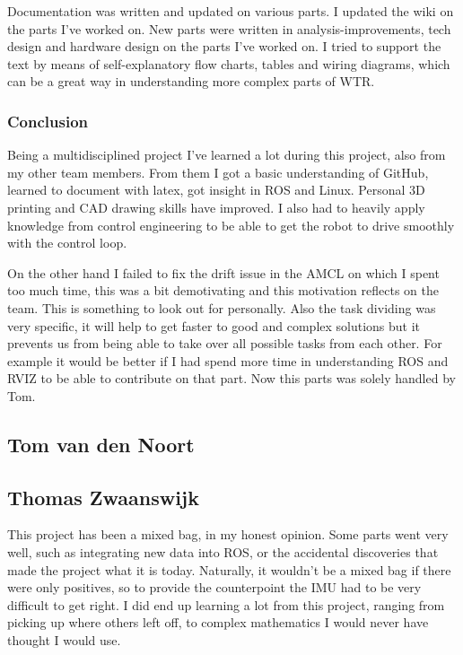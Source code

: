Documentation was written and updated on various parts. 
I updated the wiki on the parts I've worked on. 
New parts were written in analysis-improvements, tech design and hardware design on the parts I've worked on. 
I tried to support the text by means of self-explanatory flow charts, tables and wiring diagrams, which can be a great way in understanding more complex parts of WTR. 

\subsubsection{Conclusion}
Being a multidisciplined project I've learned a lot during this project, also from my other team members.
From them I got a basic understanding of GitHub, learned to document with latex, got insight in ROS and Linux. 
Personal 3D printing and CAD drawing skills have improved. 
I also had to heavily apply knowledge from control engineering to be able to get the robot to drive smoothly with the control loop.

On the other hand I failed to fix the drift issue in the AMCL on which I spent too much time, this was a bit demotivating and this motivation reflects on the team. This is something to look out for personally. 
Also the task dividing was very specific, it will help to get faster to good and complex solutions but it prevents us from being able to take over all possible tasks from each other. 
For example it would be better if I had spend more time in understanding ROS and RVIZ to be able to contribute on that part. Now this parts was solely handled by Tom.

\newpage

\subsection{Tom van den Noort}

\newpage

\subsection{Thomas Zwaanswijk}
This project has been a mixed bag, in my honest opinion.
Some parts went very well, such as integrating new data into ROS, or the accidental discoveries that made the project what it is today.
Naturally, it wouldn't be a mixed bag if there were only positives, so to provide the counterpoint the IMU had to be very difficult to get right.
I did end up learning a lot from this project, ranging from picking up where others left off, to complex mathematics I would never have thought I would use.

